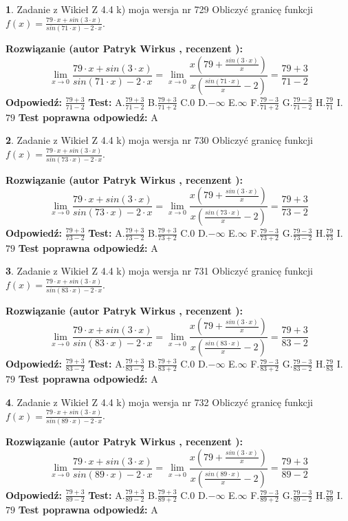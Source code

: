 \documentclass[12pt, a4paper]{article}
\theoremstyle{definition} %
\newtheorem{zad}{}
\newcommand{\zadStart}[1]{\begin{zad}#1\newline}
\newcommand{\zadStop}{\end{zad}}
\newcommand{\rozwStart}[2]{\noindent \textbf{Rozwiązanie (autor #1 , recenzent #2): }\newline}
\newcommand{\rozwStop}{\newline}
\newcommand{\odpStart}{\noindent \textbf{Odpowiedź:}\newline}
\newcommand{\odpStop}{\newline}
\newcommand{\testStart}{\noindent \textbf{Test:}\newline}
\newcommand{\testStop}{\newline}
\newcommand{\kluczStart}{\noindent \textbf{Test poprawna odpowiedź:}\newline}
\newcommand{\kluczStop}{\newline}
\begin{document}
\zadStart{Zadanie z Wikieł Z 4.4 k) moja wersja nr 729}
Obliczyć granicę funkcji $f(x)=\frac{79\cdot x +sin(3\cdot x)}{sin(71\cdot x) -2\cdot x}$.
\zadStop
\rozwStart{Patryk Wirkus}{}
$$\lim\limits_{x\to 0}\frac{79\cdot x +sin(3\cdot x)}{sin(71\cdot x) -2\cdot x}
=\lim\limits_{x\to 0}\frac{x(79+\frac{sin(3\cdot x)}{x})}{x(\frac{sin(71\cdot x)}{x}-2)}
=\frac{79+3}{71-2}$$
\rozwStop
\odpStart
$\frac{79+3}{71-2}$
\odpStop
\testStart
A.$\frac{79+3}{71-2}$
B.$\frac{79+3}{71+2}$
C.$0$
D.$-\infty$
E.$\infty$
F.$\frac{79-3}{71+2}$
G.$\frac{79-3}{71-2}$
H.$\frac{79}{71}$
I.$79$
\testStop
\kluczStart
A
\kluczStop



\zadStart{Zadanie z Wikieł Z 4.4 k) moja wersja nr 730}
Obliczyć granicę funkcji $f(x)=\frac{79\cdot x +sin(3\cdot x)}{sin(73\cdot x) -2\cdot x}$.
\zadStop
\rozwStart{Patryk Wirkus}{}
$$\lim\limits_{x\to 0}\frac{79\cdot x +sin(3\cdot x)}{sin(73\cdot x) -2\cdot x}
=\lim\limits_{x\to 0}\frac{x(79+\frac{sin(3\cdot x)}{x})}{x(\frac{sin(73\cdot x)}{x}-2)}
=\frac{79+3}{73-2}$$
\rozwStop
\odpStart
$\frac{79+3}{73-2}$
\odpStop
\testStart
A.$\frac{79+3}{73-2}$
B.$\frac{79+3}{73+2}$
C.$0$
D.$-\infty$
E.$\infty$
F.$\frac{79-3}{73+2}$
G.$\frac{79-3}{73-2}$
H.$\frac{79}{73}$
I.$79$
\testStop
\kluczStart
A
\kluczStop



\zadStart{Zadanie z Wikieł Z 4.4 k) moja wersja nr 731}
Obliczyć granicę funkcji $f(x)=\frac{79\cdot x +sin(3\cdot x)}{sin(83\cdot x) -2\cdot x}$.
\zadStop
\rozwStart{Patryk Wirkus}{}
$$\lim\limits_{x\to 0}\frac{79\cdot x +sin(3\cdot x)}{sin(83\cdot x) -2\cdot x}
=\lim\limits_{x\to 0}\frac{x(79+\frac{sin(3\cdot x)}{x})}{x(\frac{sin(83\cdot x)}{x}-2)}
=\frac{79+3}{83-2}$$
\rozwStop
\odpStart
$\frac{79+3}{83-2}$
\odpStop
\testStart
A.$\frac{79+3}{83-2}$
B.$\frac{79+3}{83+2}$
C.$0$
D.$-\infty$
E.$\infty$
F.$\frac{79-3}{83+2}$
G.$\frac{79-3}{83-2}$
H.$\frac{79}{83}$
I.$79$
\testStop
\kluczStart
A
\kluczStop



\zadStart{Zadanie z Wikieł Z 4.4 k) moja wersja nr 732}
Obliczyć granicę funkcji $f(x)=\frac{79\cdot x +sin(3\cdot x)}{sin(89\cdot x) -2\cdot x}$.
\zadStop
\rozwStart{Patryk Wirkus}{}
$$\lim\limits_{x\to 0}\frac{79\cdot x +sin(3\cdot x)}{sin(89\cdot x) -2\cdot x}
=\lim\limits_{x\to 0}\frac{x(79+\frac{sin(3\cdot x)}{x})}{x(\frac{sin(89\cdot x)}{x}-2)}
=\frac{79+3}{89-2}$$
\rozwStop
\odpStart
$\frac{79+3}{89-2}$
\odpStop
\testStart
A.$\frac{79+3}{89-2}$
B.$\frac{79+3}{89+2}$
C.$0$
D.$-\infty$
E.$\infty$
F.$\frac{79-3}{89+2}$
G.$\frac{79-3}{89-2}$
H.$\frac{79}{89}$
I.$79$
\testStop
\kluczStart
A
\kluczStop
\end{document}
